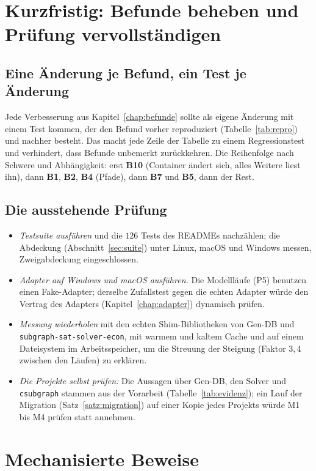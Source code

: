 \documentclass[a4paper,12pt,twoside]{report}
\DeclareRobustCommand{\_}{\ifmmode\mbox{\textunderscore}\else\textunderscore\allowbreak{}\fi}
\theoremstyle{definition}
\newcommand{\Bf}[1]{\textbf{B#1}}
\begin{document}
\section{Kurzfristig: Befunde beheben und Prüfung vervollständigen}
\label{sec:aus_kurz}

\subsection{Eine Änderung je Befund, ein Test je Änderung}
Jede Verbesserung aus Kapitel~\ref{chap:befunde} sollte als eigene Änderung mit einem Test kommen, der den Befund vorher reproduziert (Tabelle~\ref{tab:repro}) und nachher besteht. Das macht jede Zeile der Tabelle zu einem Regressionstest und verhindert, dass Befunde unbemerkt zurückkehren. Die Reihenfolge nach Schwere und Abhängigkeit: erst \Bf{10} (Container ändert sich, alles Weitere liest ihn), dann \Bf{1}, \Bf{2}, \Bf{4} (Pfade), dann \Bf{7} und \Bf{5}, dann der Rest.

\subsection{Die ausstehende Prüfung}
\begin{itemize}
	\item \emph{Testsuite ausführen} und die $126$ Tests des READMEs nachzählen; die Abdeckung (Abschnitt~\ref{sec:suite}) unter Linux, macOS und Windows messen, Zweigabdeckung eingeschlossen.
	\item \emph{Adapter auf Windows und macOS ausführen.} Die Modellläufe (P5) benutzen einen Fake-Adapter; derselbe Zufallstest gegen die echten Adapter würde den Vertrag des Adapters (Kapitel~\ref{chap:adapter}) dynamisch prüfen.
	\item \emph{Messung wiederholen} mit den echten Shim-Bibliotheken von Gen-DB und \texttt{subgraph-sat-solver-econ}, mit warmem und kaltem Cache und auf einem Dateisystem im Arbeitsspeicher, um die Streuung der Steigung (Faktor $3{,}4$ zwischen den Läufen) zu erklären.
	\item \emph{Die Projekte selbst prüfen:} Die Aussagen über Gen-DB, den Solver und \texttt{csubgraph} stammen aus der Vorarbeit (Tabelle~\ref{tab:evidenz}); ein Lauf der Migration (Satz~\ref{satz:migration}) auf einer Kopie jedes Projekts würde M1 bis M4 prüfen statt annehmen.
\end{itemize}

\section{Mechanisierte Beweise}
\label{sec:aus_mech}
\end{document}
